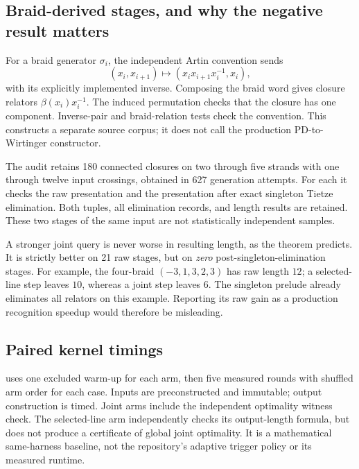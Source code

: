 \documentclass[11pt,letterpaper]{article}
\theoremstyle{definition}
\theoremstyle{remark}\newtheorem{remark}[theorem]{Remark}
\begin{document}
\subsection{Braid-derived stages, and why the negative result matters}

For a braid generator $\sigma_i$, the independent Artin convention sends
\[
 (x_i,x_{i+1})\longmapsto
 (x_ix_{i+1}x_i^{-1},x_i),
\]
with its explicitly implemented inverse. Composing the braid word gives
closure relators $\beta(x_i)x_i^{-1}$. The induced permutation checks that
the closure has one component. Inverse-pair and braid-relation tests check
the convention. This constructs a separate source corpus; it does not call
the production PD-to-Wirtinger constructor.

The audit retains 180 connected closures on two through five strands with
one through twelve input crossings, obtained in 627 generation attempts.
For each it checks the raw presentation and the presentation after exact
singleton Tietze elimination. Both tuples, all elimination records, and
length results are retained. These two stages of the same input are not
statistically independent samples.

A stronger joint query is never worse in resulting length, as the theorem
predicts. It is strictly better on 21 raw stages, but on \emph{zero}
post-singleton-elimination stages. For example, the four-braid
$(-3,1,3,2,3)$ has raw length $12$; a selected-line step leaves $10$, whereas
a joint step leaves $6$. The singleton prelude already eliminates all
relators on this example. Reporting its raw gain as a production recognition
speedup would therefore be misleading.

\subsection{Paired kernel timings}

 uses one excluded warm-up for each arm,
then five measured rounds with shuffled arm order for each case. Inputs are
preconstructed and immutable; output construction is timed. Joint arms
include the independent optimality witness check. The selected-line arm
independently checks its output-length formula, but does not produce a
certificate of global joint optimality. It is a mathematical same-harness
baseline, not the repository's adaptive trigger policy or its measured runtime.
\end{document}
